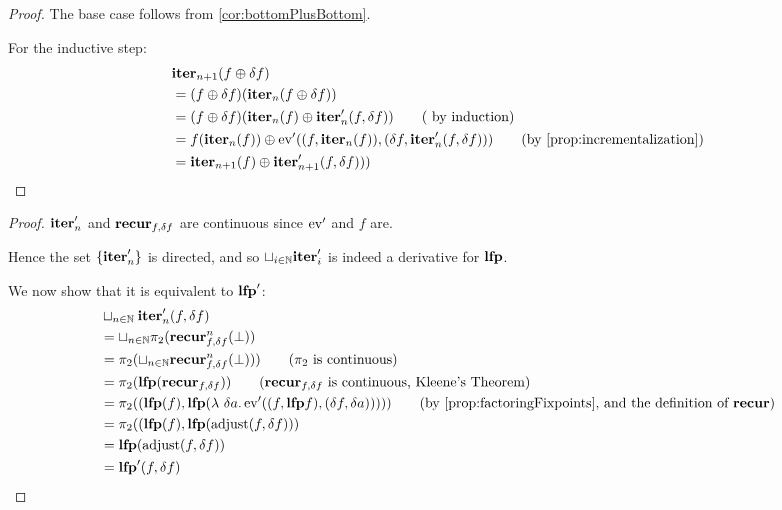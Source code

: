 \iterDerivativesF*
\begin{proof}
  \label{prf:iterDerivativesF}
  The base case follows from \cref{cor:bottomPlusBottom}.

  For the inductive step:
  \begin{align*}
    &\iter_{n+1}(f \cplus \change{f})\\
    &=(f \cplus \change{f})(\iter_{n}(f \cplus \change{f}))\\
    &= (f \cplus \change{f})(
        \iter_{n}(f)
        \cplus \derive{\iter_{n}}(f, \change{f})
      )
    \tag{ by induction}\\
    &= f(\iter_n(f)) \cplus \derive{\ev}((f, \iter_{n}(f)), (\change{f},
      \derive{\iter_{n}}(f, \change{f})))
    \tag{by \cref{prop:incrementalization}}\\
    & =\iter_{n+1}(f) \cplus \derive{\iter_{n+1}}(f, \change{f})))
  \end{align*}
\end{proof}

\leastFixpointDerivatives*
\begin{proof}
  \label{prf:leastFixpointDerivatives}
  $\textbf{iter}_n'$ and $\textbf{recur}_{f, \delta f}$ are continuous since
  $\operatorname{ev}'$ and $f$ are.

  Hence the set $\{ \textbf{iter}'_n \}$ is directed, and so $\sqcup_{i \in \mathbb{N}}
  \textbf{iter}_i'$ is indeed a derivative for $\textbf{lfp}$.

  We now show that it is equivalent to $\textbf{lfp}'$:
  \begin{align*}
    &\sqcup_{n \in \NN} \derive{\iter_n}(f, \change{f})\\
    &=\sqcup_{n \in \NN} \pi_2(\nextiter_{f, \change{f}}^n(\bot))\\
    &=\pi_2(\sqcup_{n \in \NN} \nextiter_{f, \change{f}}^n(\bot))) \tag{$\pi_2$ is continuous}\\
    &= \pi_2 (\lfp(\nextiter_{f, \change{f}})) \tag{$\nextiter_{f, \change{f}}$ is continuous, Kleene's Theorem}\\
    &= \pi_2 ((\lfp(f), \lfp (\lambda\ \change{a}. \derive{\ev}((f, \lfp f), (\change{f}, \change{a})))))
    \tag{by \cref{prop:factoringFixpoints}, and the definition of $\nextiter$}\\
    &= \pi_2 ((\lfp(f), \lfp(\adjust(f, \change{f})))\\
    &= \lfp(\adjust(f, \change{f}))\\
    &= \derive{\lfp}(f, \change{f})
  \end{align*}
\end{proof}


